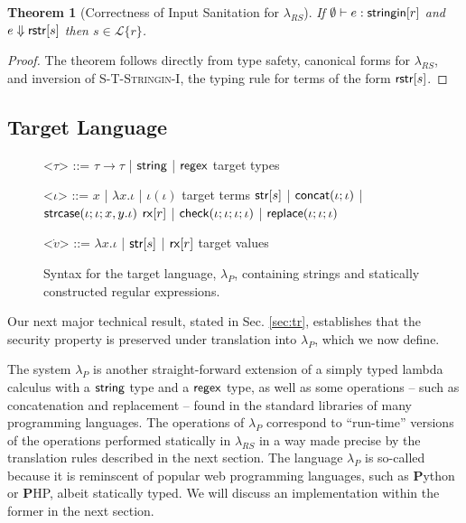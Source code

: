 \documentclass[9pt]{sig-alternate}
\newtheorem{thm}{Theorem}
\theoremstyle{definition}
\newcommand{\Lagr}{\mathcal{L}}
\newcommand{\lang}[1]{\Lagr\{#1\}}
\newcommand{\lambdas}{\lambda_{RS}}
\newcommand{\lambdap}{\lambda_P}
\newcommand{\stringin}[1]{{\sf stringin}[#1]}
\newcommand{\tcheck}[4]{{\sf check}(#1; #2; #3; #4)}
\renewcommand{\tstr}[1]{{{\sf str}[#1]}}
\newcommand{\preplace}[3]{{\sf replace}(#1;#2;#3)}
\newcommand{\tconcat}[2]{{\sf concat}(#1;#2)} \newcommand{\concat}[2]{{\sf concat}(#1;#2)} %
\newcommand{\rx}[1]{ {\sf rx}[#1] }
\newcommand{\str}{{\sf string}}
\newcommand{\regex}{{\sf regex}}
\newcommand{\pstrcase}[3]{ {\sf strcase}(#1; #2; #3)}
\newcommand{\sreduces}{ \Downarrow }
\begin{document}
\begin{thm}[Correctness of Input Sanitation for $\lambdas$]\label{thm:scorrect}
  If  $\emptyset \vdash e : \stringin{r}$ and $e \sreduces \rstr{s}$ then $s \in \lang{r}$.
\end{thm}
\begin{proof}
  The theorem follows directly from type safety, canonical forms for $\lambdas$, and inversion of \textsc{S-T-Stringin-I}, the typing rule for terms of the form ${\sf rstr}[s]$.
\end{proof}

\subsection{Target Language}\label{sec:p}
\begin{figure}[t]
\small
  \begin{grammar}

<$\tau$> ::= $\tau \rightarrow \tau$ | $\str$ | $\regex$ \hfill target types

<$\iota$> ::= $x$ | $\lambda x . \iota$ | $\iota(\iota)$ \hfill target terms \alt
$\tstr{s}$ | $\tconcat{\iota}{\iota}$ | $\pstrcase{\iota}{\iota}{x,y.\iota}$ \alt
  $\rx{r}$ | $\tcheck{\iota}{\iota}{\iota}{\iota}$ | $\preplace{\iota}{\iota}{\iota}$

  <$\dot{v}$> ::= $\lambda x . \iota$ | $\tstr{s}$ | $\rx{r}$ \hfill target values

\end{grammar}
\caption{Syntax for the target language, $\lambdap$, containing strings and statically constructed regular expressions.}
\label{fig:lcsSyntax}
\end{figure}
Our next major technical result, stated in Sec. \ref{sec:tr}, establishes that the security property
is preserved under translation into $\lambdap$, which we now define.

The system $\lambdap$ is another straight-forward extension of a simply typed lambda calculus
with a $\str$ type and a $\regex$ type, as well as 
some operations -- such as concatenation and replacement -- found in the standard libraries of many programming languages.
The operations of $\lambdap $ correspond to ``run-time'' versions of the operations performed statically in $\lambdas$ in a way made precise by the translation rules described in the next section. 
The language $\lambdap$ is so-called because it is reminscent of popular web programming languages,
such as \textbf{P}ython or \textbf{P}HP, albeit statically typed. We will discuss an implementation within the former in the next section.
\end{document}
